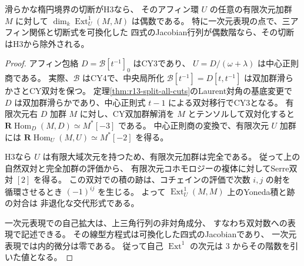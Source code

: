 \begin{proposition}\label{prop:cubic-CY-three-alpha-elliptic-character-parity}
滑らかな楕円境界の切断がH3なら、
そのアフィン環 $U$ の任意の有限次元加群 $M$ に対して
$\dim_k\operatorname{Ext}^1_U(M,M)$ は偶数である。
特に一次元表現の点で、三アフィン関係と切断式を可換化した
四式のJacobian行列が偶数階なら、その切断はH3から除外される。
\end{proposition}
\begin{proof}
アフィン包絡 $D=\mathcal B[t^{-1}]_0$ はCY3であり、
$U=D/(\omega+\lambda)$ は中心正則商である。
実際、$\mathcal B$ はCY4で、中央局所化
$\mathcal B[t^{-1}]=D[t,t^{-1}]$ は双加群滑らかさとCY双対を保つ。
定理\ref{thm:r13-split-all-cuts}のLaurent対角の基底変更で
$D$ は双加群滑らかであり、中心正則式 $t-1$ による双対移行でCY3となる。
有限次元右 $D$ 加群 $M$ に対し、CY双加群解消を $M$ とテンソルして双対化すると
$\mathbf R\operatorname{Hom}_D(M,D)\simeq M^*[-3]$ である。
中心正則商の変換で、有限次元 $U$ 加群には
$\mathbf R\operatorname{Hom}_U(M,U)\simeq M^*[-2]$ を得る。

H3なら $U$ は有限大域次元を持つため、有限次元加群は完全である。
従って上の自然双対と完全加群の評価から、
有限次元コホモロジーの複体に対してSerre双対 $[2]$ を得る。
この双対での積の跡は、コチェインの評価で次数 $i,j$ の射を
循環させるとき $(-1)^{ij}$ を生じる。
よって $\operatorname{Ext}^1_U(M,M)$ 上のYoneda積と跡の対合は
非退化な交代形式である。

一次元表現での自己拡大は、上三角行列の非対角成分、
すなわち双対数への表現で記述できる。
その線型方程式は可換化した四式のJacobianであり、
一次元表現では内的微分は零である。
従って自己 $\operatorname{Ext}^1$ の次元は $3$ からその階数を引いた値となる。
\end{proof}

